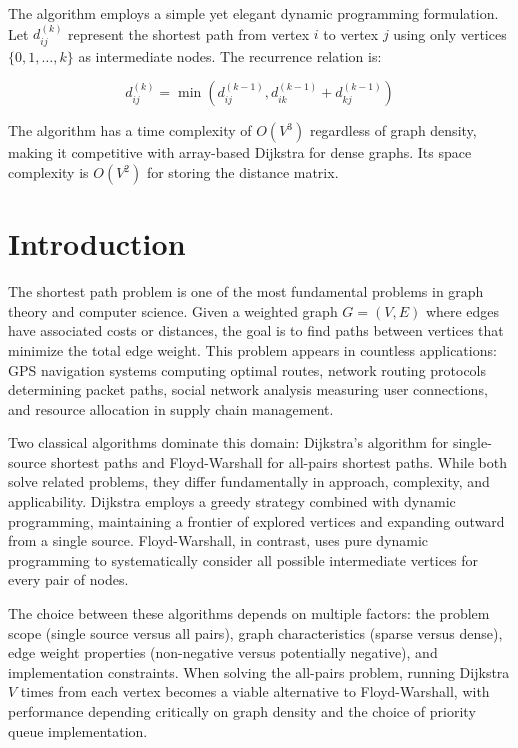 \documentclass[12pt, a4paper]{report}
\begin{document}
The algorithm employs a simple yet elegant dynamic programming formulation. Let $d_{ij}^{(k)}$ represent the shortest path from vertex $i$ to vertex $j$ using only vertices $\{0, 1, \ldots, k\}$ as intermediate nodes. The recurrence relation is:

\begin{equation}
d_{ij}^{(k)} = \min(d_{ij}^{(k-1)}, d_{ik}^{(k-1)} + d_{kj}^{(k-1)})
\end{equation}

The algorithm has a time complexity of $O(V^3)$ regardless of graph density, making it competitive with array-based Dijkstra for dense graphs. Its space complexity is $O(V^2)$ for storing the distance matrix.

\section{Introduction}

The shortest path problem is one of the most fundamental problems in graph theory and computer science. Given a weighted graph $G = (V, E)$ where edges have associated costs or distances, the goal is to find paths between vertices that minimize the total edge weight. This problem appears in countless applications: GPS navigation systems computing optimal routes, network routing protocols determining packet paths, social network analysis measuring user connections, and resource allocation in supply chain management.

Two classical algorithms dominate this domain: Dijkstra's algorithm for single-source shortest paths and Floyd-Warshall for all-pairs shortest paths. While both solve related problems, they differ fundamentally in approach, complexity, and applicability. Dijkstra employs a greedy strategy combined with dynamic programming, maintaining a frontier of explored vertices and expanding outward from a single source. Floyd-Warshall, in contrast, uses pure dynamic programming to systematically consider all possible intermediate vertices for every pair of nodes.

The choice between these algorithms depends on multiple factors: the problem scope (single source versus all pairs), graph characteristics (sparse versus dense), edge weight properties (non-negative versus potentially negative), and implementation constraints. When solving the all-pairs problem, running Dijkstra $V$ times from each vertex becomes a viable alternative to Floyd-Warshall, with performance depending critically on graph density and the choice of priority queue implementation.
\end{document}
